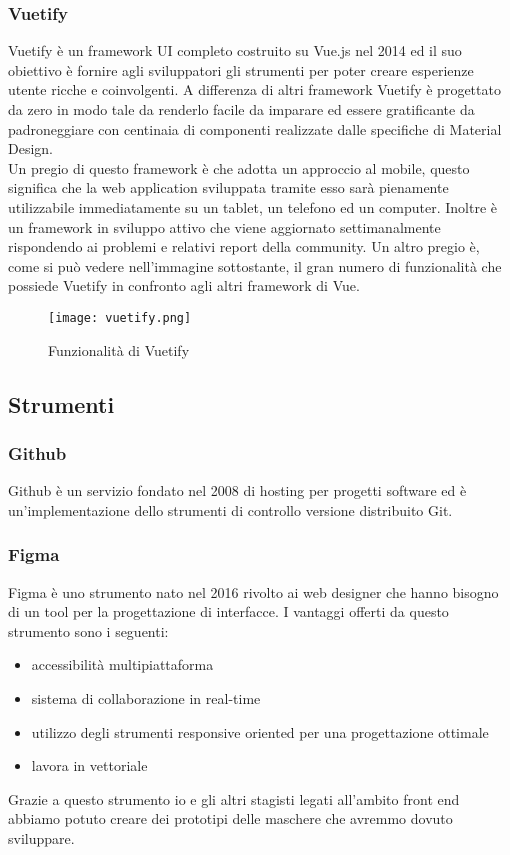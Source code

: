 \subsubsection*{Vuetify}
Vuetify è un framework UI completo costruito su Vue.js nel 2014 ed il suo obiettivo è fornire agli sviluppatori gli strumenti per poter creare esperienze utente ricche e coinvolgenti. A differenza di altri framework Vuetify è progettato da zero in modo tale da renderlo facile da imparare ed essere gratificante da padroneggiare con centinaia di componenti realizzate dalle specifiche di Material Design.\\
Un pregio di questo framework è che adotta un approccio al mobile, questo significa che la web application sviluppata tramite esso sarà pienamente utilizzabile immediatamente su un tablet, un telefono ed un computer. Inoltre è un framework in sviluppo attivo che viene aggiornato settimanalmente rispondendo ai problemi e relativi report della community. Un altro pregio è, come si può vedere nell'immagine sottostante, il gran numero di funzionalità che possiede Vuetify in confronto agli altri framework di Vue.
\begin{figure}[H]
	\begin{center}
		\texttt{[image: vuetify.png]}
		\caption{Funzionalità di Vuetify}
	\end{center}
\end{figure}

\subsection{Strumenti}

\subsubsection{Github}

Github è un servizio fondato nel 2008 di hosting per progetti software ed è un'implementazione dello strumenti di controllo versione distribuito Git.

\subsubsection{Figma}

Figma è uno strumento nato nel 2016 rivolto ai web designer che hanno bisogno di un tool per la progettazione di interfacce. I vantaggi offerti da questo strumento sono i seguenti:
\begin{itemize}
	\item accessibilità multipiattaforma
	\item sistema di collaborazione in real-time
	\item utilizzo degli strumenti responsive oriented per una progettazione ottimale
	\item lavora in vettoriale
\end{itemize}
Grazie a questo strumento io e gli altri stagisti legati all'ambito front end abbiamo potuto creare dei prototipi delle maschere che avremmo dovuto sviluppare.

